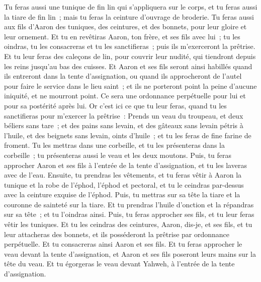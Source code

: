 \begin{multicols}{2}
Tu feras aussi une tunique de fin lin qui s'appliquera sur le corps, et tu feras aussi la tiare de fin lin~; mais tu feras la ceinture d'ouvrage de broderie.
Tu feras aussi aux fils d'Aaron des tuniques, des ceintures, et des bonnets, pour leur gloire et leur ornement.
Et tu en revêtiras Aaron, ton frère, et ses fils avec lui~; tu les oindras, tu les consacreras et tu les sanctifieras~; puis ils m'exerceront la prêtrise.
Et tu leur feras des caleçons de lin, pour couvrir leur nudité, qui tiendront depuis les reins jusqu'au bas des cuisses.
Et Aaron et ses fils seront ainsi habillés quand ils entreront dans la tente d'assignation, ou quand ils approcheront de l'autel pour faire le service dans le lieu saint~; et ils ne porteront point la peine d'aucune iniquité, et ne mourront point. Ce sera une ordonnance perpétuelle pour lui et pour sa postérité après lui.
\VerseOne{}Or c'est ici ce que tu leur feras, quand tu les sanctifieras pour m'exercer la prêtrise~: Prends un veau du troupeau, et deux béliers sans tare~;
et des pains sans levain, et des gâteaux sans levain pétris à l'huile, et des beignets sans levain, oints d'huile~; et tu les feras de fine farine de froment.
Tu les mettras dans une corbeille, et tu les présenteras dans la corbeille~; tu présenteras aussi le veau et les deux moutons.
Puis, tu feras approcher Aaron et ses fils à l'entrée de la tente d'assignation, et tu les laveras avec de l'eau.
Ensuite, tu prendras les vêtements, et tu feras vêtir à Aaron la tunique et la robe de l'éphod, l'éphod et pectoral, et tu le ceindras par-dessus avec la ceinture exquise de l'éphod.
Puis, tu mettras sur sa tête la tiare et la couronne de sainteté sur la tiare.
Et tu prendras l'huile d'onction et la répandras sur sa tête~; et tu l'oindras ainsi.
Puis, tu feras approcher ses fils, et tu leur feras vêtir les tuniques.
Et tu les ceindras des ceintures, Aaron, dis-je, et ses fils, et tu leur attacheras des bonnets, et ils posséderont la prêtrise par ordonnance perpétuelle. Et tu consacreras ainsi Aaron et ses fils.
Et tu feras approcher le veau devant la tente d'assignation, et Aaron et ses fils poseront leurs mains sur la tête du veau.
Et tu égorgeras le veau devant Yahweh, à l'entrée de la tente d'assignation.

\end{multicols}
